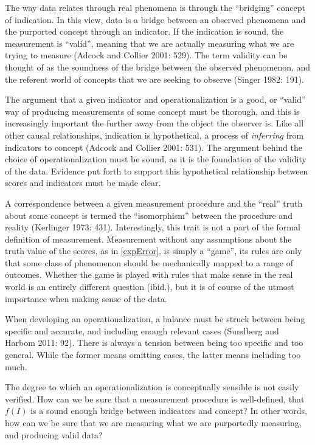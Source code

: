 \documentclass[12pt,twoside]{reedthesis}
\begin{document}
The way data relates through real phenomena is through the ``bridging''
concept of indication. In this view, data is a bridge between an
observed phenomena and the purported concept through an indicator. If
the indication is sound, the measurement is ``valid'', meaning that we
are actually measuring what we are trying to measure (Adcock and Collier
2001: 529). The term validity can be thought of as the soundness of the
bridge between the observed phenomenon, and the referent world of
concepts that we are seeking to observe (Singer 1982: 191).

The argument that a given indicator and operationalization is a good, or
``valid'' way of producing measurements of some concept must be
thorough, and this is increasingly important the further away from the
object the observer is. Like all other causal relationships, indication
is hypothetical, a process of \emph{inferring} from indicators to
concept (Adcock and Collier 2001: 531). The argument behind the choice
of operationalization must be sound, as it is the foundation of the
validity of the data. Evidence put forth to support this hypothetical
relationship between scores and indicators must be made clear.

A correspondence between a given measurement procedure and the ``real''
truth about some concept is termed the ``isomorphism'' between the
procedure and reality (Kerlinger 1973: 431). Interestingly, this trait
is not a part of the formal definition of measurement. Measurement
without any assumptions about the truth value of the scores, as in
\ref{expError}, is simply a ``game'', its rules are only that some class
of phenomenon should be mechanically mapped to a range of outcomes.
Whether the game is played with rules that make sense in the real world
is an entirely different question (ibid.), but it is of course of the
utmost importance when making sense of the data.

When developing an operationalization, a balance must be struck between
being specific and accurate, and including enough relevant cases
(Sundberg and Harbom 2011: 92). There is always a tension between being
too specific and too general. While the former means omitting cases, the
latter means including too much.

The degree to which an operationalization is conceptually sensible is
not easily verified. How can we be sure that a measurement procedure is
well-defined, that \(f(I)\) is a sound enough bridge between indicators
and concept? In other words, how can we be sure that we are measuring
what we are purportedly measuring, and producing valid data?
\end{document}
